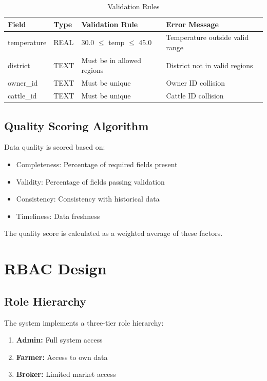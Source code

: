 \begin{table}[H]
\centering
\begin{tabular}{|l|l|l|l|}
\hline
\textbf{Field} & \textbf{Type} & \textbf{Validation Rule} & \textbf{Error Message} \\
\hline
temperature & REAL & 30.0 $\leq$ temp $\leq$ 45.0 & Temperature outside valid range \\
district & TEXT & Must be in allowed regions & District not in valid regions \\
owner\_id & TEXT & Must be unique & Owner ID collision \\
cattle\_id & TEXT & Must be unique & Cattle ID collision \\
\hline
\end{tabular}
\caption{Validation Rules}
\end{table}

\subsection{Quality Scoring Algorithm}

Data quality is scored based on:

\begin{itemize}
    \item Completeness: Percentage of required fields present
    \item Validity: Percentage of fields passing validation
    \item Consistency: Consistency with historical data
    \item Timeliness: Data freshness
\end{itemize}

The quality score is calculated as a weighted average of these factors.

\section{RBAC Design}

\subsection{Role Hierarchy}

The system implements a three-tier role hierarchy:

\begin{enumerate}
    \item \textbf{Admin:} Full system access
    \item \textbf{Farmer:} Access to own data
    \item \textbf{Broker:} Limited market access
\end{enumerate}

